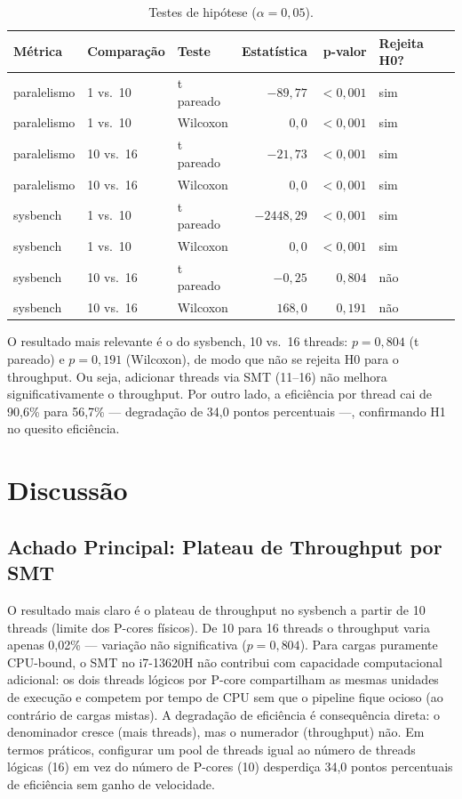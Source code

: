 \documentclass[12pt]{article}
\begin{document}
\begin{table}[ht]
\centering
\caption{Testes de hipótese ($\alpha = 0{,}05$).}
\label{tab:hip}
\begin{tabular}{lllrrl}
\hline
\textbf{Métrica} & \textbf{Comparação} & \textbf{Teste} & \textbf{Estatística} & \textbf{p-valor} & \textbf{Rejeita H0?} \\
\hline
paralelismo & 1 vs.\ 10  & t pareado & $-89,77$   & $<0{,}001$ & sim \\
paralelismo & 1 vs.\ 10  & Wilcoxon  & $0,0$      & $<0{,}001$ & sim \\
paralelismo & 10 vs.\ 16 & t pareado & $-21,73$   & $<0{,}001$ & sim \\
paralelismo & 10 vs.\ 16 & Wilcoxon  & $0,0$      & $<0{,}001$ & sim \\
sysbench    & 1 vs.\ 10  & t pareado & $-2448,29$ & $<0{,}001$ & sim \\
sysbench    & 1 vs.\ 10  & Wilcoxon  & $0,0$      & $<0{,}001$ & sim \\
sysbench    & 10 vs.\ 16 & t pareado & $-0,25$    & $0,804$    & não \\
sysbench    & 10 vs.\ 16 & Wilcoxon  & $168,0$    & $0,191$    & não \\
\hline
\end{tabular}
\end{table}

O resultado mais relevante é o do sysbench, 10 vs.\ 16 threads: $p = 0{,}804$ (t
pareado) e $p = 0{,}191$ (Wilcoxon), de modo que não se rejeita H0 para o
throughput. Ou seja, adicionar threads via SMT (11--16) não melhora
significativamente o throughput. Por outro lado, a eficiência por thread cai de
90,6\% para 56,7\% --- degradação de 34,0 pontos percentuais ---, confirmando
H1 no quesito eficiência.

\section{Discussão}
\label{sec:discussao}

\subsection{Achado Principal: Plateau de Throughput por SMT}

O resultado mais claro é o plateau de throughput no sysbench a partir de 10
threads (limite dos P-cores físicos). De 10 para 16 threads o throughput varia
apenas 0,02\% --- variação não significativa ($p = 0{,}804$). Para cargas
puramente CPU-bound, o SMT no i7-13620H não contribui com capacidade
computacional adicional: os dois threads lógicos por P-core compartilham as
mesmas unidades de execução e competem por tempo de CPU sem que o pipeline
fique ocioso (ao contrário de cargas mistas). A degradação de eficiência é
consequência direta: o denominador cresce (mais threads), mas o numerador
(throughput) não. Em termos práticos, configurar um pool de threads igual ao
número de threads lógicas (16) em vez do número de P-cores (10) desperdiça 34,0
pontos percentuais de eficiência sem ganho de velocidade.
\end{document}
